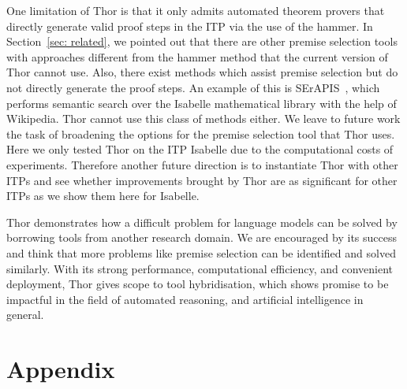 \documentclass{article}
\begin{document}
One limitation of Thor is that it only admits automated theorem provers that directly generate valid proof steps in the ITP via the use of the hammer. In Section~\ref{sec: related}, we pointed out that there are other premise selection tools with approaches different from the hammer method that the current version of Thor cannot use. Also, there exist methods which assist premise selection but do not directly generate the proof steps. An example of this is SErAPIS~\citep{stathopoulos2020serapis}, which performs semantic search over the Isabelle mathematical library with the help of Wikipedia. Thor cannot use this class of methods either.
We leave to future work the task of broadening the options for the premise selection tool that Thor uses.
Here we only tested Thor on the ITP Isabelle due to the computational costs of experiments. Therefore another future direction is to instantiate Thor with other ITPs and see whether improvements brought by Thor are as significant for other ITPs as we show them here for Isabelle.

Thor demonstrates how a difficult problem for language models can be solved by borrowing tools from another research domain.
We are encouraged by its success and think that more problems like premise selection can be identified and solved similarly.
With its strong performance, computational efficiency, and convenient deployment, Thor gives scope to tool hybridisation, which shows promise to be impactful in the field of automated reasoning, and artificial intelligence in general.







 




























\newpage




\appendix


\section{Appendix}
\label{sec: appendix}
\end{document}

